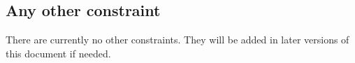\subsection{Any other constraint}

There are currently no other constraints. They will be added in later versions of this document if needed.
